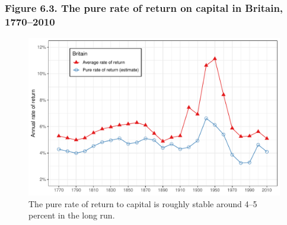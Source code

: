 \documentclass[t]{beamer}\usepackage[]{graphicx}\usepackage[]{color}
\newenvironment{knitrout}{}{} %
\begin{document}
\begin{frame}[label=Figure_6_3]
\frametitle{Figure 6.3. The pure rate of return on capital in Britain, 1770--2010}
\begin{figure}[t]
\begin{minipage}[b]{\textwidth}
\centering
\begin{knitrout}\footnotesize
{}\color{fgcolor}

{\centering \includegraphics[width=1\linewidth]{figures/color/Figure_6_3} 

}



\end{knitrout}
\caption{The pure rate of return to capital is roughly stable around 4--5 percent in the long run.}
\end{minipage}
\end{figure}
\end{frame}
\end{document}
